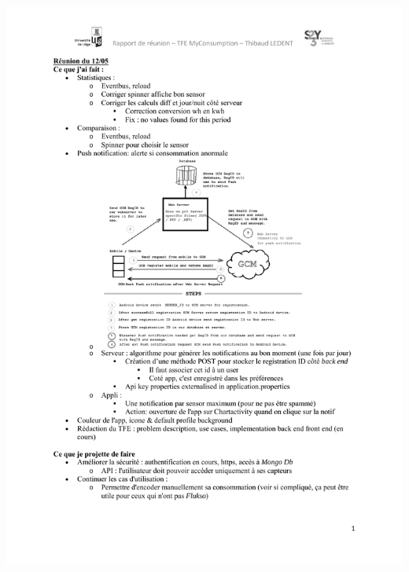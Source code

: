 \documentclass[a4paper, oneside, 11pt]{book}
\begin{document}
\includegraphics[width=1\textwidth]{reports_NB_Part17.pdf}
\newpage
\end{document}

